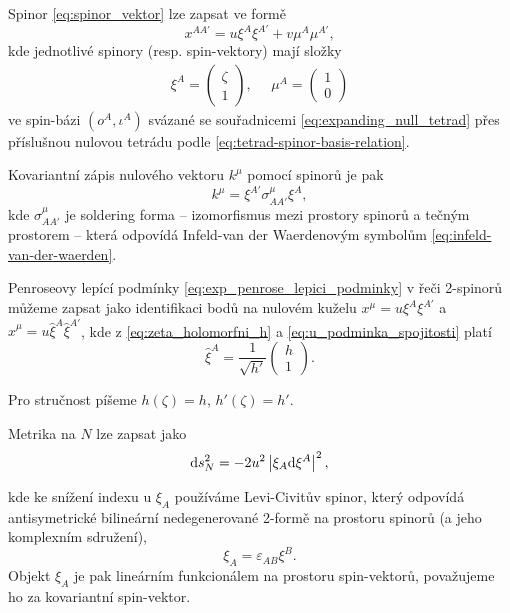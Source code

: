 Spinor \eqref{eq:spinor_vektor} lze zapsat ve formě
\begin{equation}
    \label{spinor_position}
    x^{AA'} = u \xi^A \xi^{A'} + v \mu^A \mu^{A'},
\end{equation}
kde jednotlivé spinory (resp. spin-vektory) mají složky
\begin{align}
    \label{eq:xi_mu_explicitne_v_bazi}
    \xi^A = \begin{pmatrix}
        \zeta \\ 1
    \end{pmatrix}, ~~~~~~ \mu^A = \begin{pmatrix}
        1 \\ 0
    \end{pmatrix}
\end{align}
ve spin-bázi $(o^A, \iota^A)$ svázané se souřadnicemi \eqref{eq:expanding_null_tetrad} přes příslušnou
nulovou tetrádu podle \eqref{eq:tetrad-spinor-basis-relation}.

Kovariantní zápis nulového vektoru $k^\mu$ pomocí spinorů je pak
\begin{equation}
    k^\mu = \xi^{A'} \sigma^\mu_{AA'} \xi^{A},
\end{equation}
kde $\sigma^\mu_{AA'}$ je soldering forma -- izomorfismus mezi prostory spinorů a tečným prostorem -- která
odpovídá Infeld-van der Waerdenovým symbolům \eqref{eq:infeld-van-der-waerden}.

Penroseovy lepící podmínky \eqref{eq:exp_penrose_lepici_podminky} v řeči 2-spinorů můžeme zapsat jako
identifikaci bodů na nulovém kuželu $x^\mu = u \xi^A \xi^{A'}$ a $\hat{x}^\mu = u \hat{\xi}^A \hat{\xi}^{A'}$,
kde z \eqref{eq:zeta_holomorfni_h} a \eqref{eq:u_podminka_spojitosti} platí
\begin{equation}
    \label{eq:xi_transformace}
    \hat{\xi}^A = \frac{1}{\sqrt{h'}} \begin{pmatrix}
        h \\ 1
    \end{pmatrix}.
\end{equation}

Pro stručnost píšeme $h(\zeta) = h$, $h'(\zeta) = h'$.

Metrika na $N$ lze zapsat jako
\begin{equation}
    \mathrm{d} s_N^2 = - 2 u^2 \left| \xi_A \mathrm{d} \xi^A \right|^2,
\end{equation}

kde ke snížení indexu u $\xi_A$ používáme Levi-Civitův spinor, který odpovídá
antisymetrické bilineární nedegenerované 2-formě na prostoru spinorů (a jeho komplexním sdružení),
\begin{equation}
    \xi_A = \varepsilon_{AB} \xi^B.
\end{equation}
Objekt $\xi_A$ je pak lineárním funkcionálem na prostoru spin-vektorů, považujeme ho za kovariantní spin-vektor.

